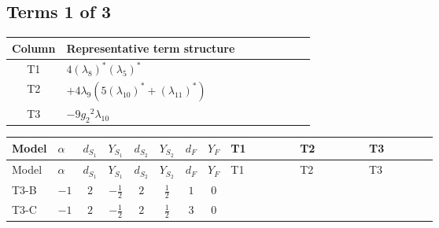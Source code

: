 \documentclass[8pt]{article}
\begin{document}
\begin{landscape}
\subsection*{Terms 1 of 3}
\begin{center}
\begin{tabular}{@{}c >{\raggedright\arraybackslash}p{0.82\linewidth}@{}}
\toprule
Column & Representative term structure \\
\midrule
T1 & \(\displaystyle 4 \left({\lambda_8}\right)^{*} \left({\lambda_5}\right)^{*}\) \\
\midrule
T2 & \(\displaystyle +4 {\lambda_9} (5 \left({\lambda_{10}}\right)^{*}+\left({\lambda_{11}}\right)^{*})\) \\
\midrule
T3 & \(\displaystyle -9 {g_2}^2 {\lambda_{10}}\) \\
\midrule
\bottomrule
\end{tabular}
\end{center}
\smallskip
\tiny
\begin{longtable}{@{}llcccccc >{\raggedright\arraybackslash}p{0.21\linewidth} >{\raggedright\arraybackslash}p{0.21\linewidth} >{\raggedright\arraybackslash}p{0.21\linewidth}@{}}
\toprule
Model & $\alpha$ & $d_{S_1}$ & $Y_{S_1}$ & $d_{S_2}$ & $Y_{S_2}$ & $d_F$ & $Y_F$ & T1 & T2 & T3 \\
\midrule
\endfirsthead
\toprule
Model & $\alpha$ & $d_{S_1}$ & $Y_{S_1}$ & $d_{S_2}$ & $Y_{S_2}$ & $d_F$ & $Y_F$ & T1 & T2 & T3 \\
\midrule
\endhead
T3-B & $-1$ & $2$ & $-\frac{1}{2}$ & $2$ & $\frac{1}{2}$ & $1$ & $0$ & \scriptsize\adjustbox{max width=\linewidth}{$\begin{gathered} 4 \left({\lambda_8}\right)^{*} \left({\lambda_5}\right)^{*}\end{gathered}$} & \scriptsize\adjustbox{max width=\linewidth}{$\begin{gathered} +4 {\lambda_9} (5 \left({\lambda_{10}}\right)^{*}+\left({\lambda_{11}}\right)^{*})\end{gathered}$} & \scriptsize\adjustbox{max width=\linewidth}{$\begin{gathered} -9 {g_2}^2 {\lambda_{10}}\end{gathered}$} \\
\midrule
T3-C & $-1$ & $2$ & $-\frac{1}{2}$ & $2$ & $\frac{1}{2}$ & $3$ & $0$ & \scriptsize\adjustbox{max width=\linewidth}{$\begin{gathered} 4 \left({\lambda_8}\right)^{*} \left({\lambda_5}\right)^{*}\end{gathered}$} & \scriptsize\adjustbox{max width=\linewidth}{$\begin{gathered} +4 {\lambda_9} (5 \left({\lambda_{10}}\right)^{*}+\left({\lambda_{11}}\right)^{*})\end{gathered}$} & \scriptsize\adjustbox{max width=\linewidth}{$\begin{gathered} -9 {g_2}^2 {\lambda_{10}}\end{gathered}$} \\

\end{longtable}
\end{landscape}
\end{document}
